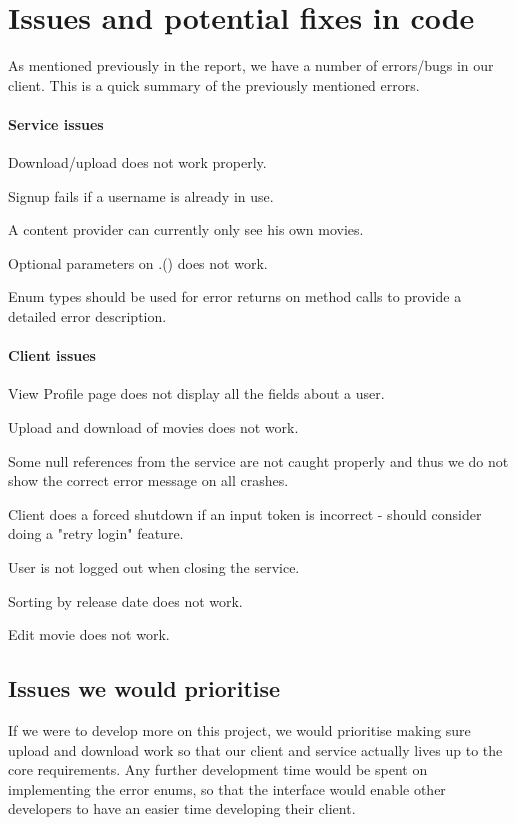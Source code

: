 \section{Issues and potential fixes in code}
\label{Conclusion_Issues}
As mentioned previously in the report, we have a number of errors/bugs in our client. This is a quick summary of the previously mentioned errors.
\paragraph{Service issues}
\begin{my_itemize}
\item Download/upload does not work properly.
\item Signup fails if a username is already in use.
\item A content provider can currently only see his own movies.
\item Optional parameters on .() does not work.
\item Enum types should be used for error returns on method calls to provide a detailed error description.
\end{my_itemize}
\paragraph{Client issues}
\begin{my_itemize}
\item View Profile page does not display all the fields about a user.
\item Upload and download of movies does not work.
\item Some null references from the service are not caught properly and thus we do not show the correct error message on all crashes.
\item Client does a forced shutdown if an input token is incorrect - should consider doing a "retry login" feature.
\item User is not logged out when closing the service.
\item Sorting by release date does not work.
\item Edit movie does not work.
\end{my_itemize}
\subsection{Issues we would prioritise}
\label{Conclusion_Issues_Prioritise}
If we were to develop more on this project, we would prioritise making sure upload and download work so that our client and service actually lives up to the core requirements. Any further development time would be spent on implementing the error enums, so that the interface would enable other developers to have an easier time developing their client.
